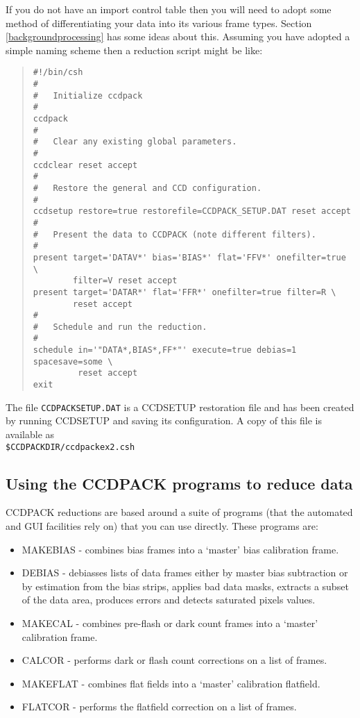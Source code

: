\documentclass[twoside,11pt]{article}
\newcommand{\htmlref}[2]{#1}
\newcommand{\latexhtml}[2]{#1}
\renewcommand{\_}{\texttt{\symbol{95}}}
\newcommand{\ttsize}{\latexhtml{\small}{}}
\newenvironment{myquote}{\begin{quote}\ttsize}{\end{quote}}
\newcommand{\text}[1]{{\ttsize \tt #1}}
\newcommand{\routine}[1]{{\sc #1}}
\newcommand{\xroutine}[1]{\htmlref{{\sc #1}}{#1}}
\begin{document}
If you do not have an import control table then you will need to adopt
some method of differentiating your data into its various frame
types. Section \ref{backgroundprocessing} has some ideas about this.
Assuming you have adopted a simple naming scheme then a reduction
script might be like:

\begin{center}
\end{center}
\begin{myquote}
\begin{verbatim}
#!/bin/csh
#
#   Initialize ccdpack
#
ccdpack
#
#   Clear any existing global parameters.
#
ccdclear reset accept
#
#   Restore the general and CCD configuration.
#
ccdsetup restore=true restorefile=CCDPACK_SETUP.DAT reset accept
#
#   Present the data to CCDPACK (note different filters).
#
present target='DATAV*' bias='BIAS*' flat='FFV*' onefilter=true \
        filter=V reset accept
present target='DATAR*' flat='FFR*' onefilter=true filter=R \
        reset accept
#
#   Schedule and run the reduction.
#
schedule in='"DATA*,BIAS*,FF*"' execute=true debias=1 spacesave=some \
         reset accept
exit
\end{verbatim}
\end{myquote}
The file \text{CCDPACK\_SETUP.DAT}
is a \xroutine{CCDSETUP} restoration file and has been created by
running \routine{CCDSETUP} and saving its configuration.
A copy of this file is available as \\
\text{\$CCDPACK\_DIR/ccdpack\_ex2.csh}

\subsection{Using the CCDPACK programs to reduce data}
CCDPACK reductions are based around a suite of programs (that the
automated and GUI facilities rely on) that you can use directly. These
programs are:
\begin{itemize}
\item \xroutine{MAKEBIAS} - combines bias frames into a `master' bias calibration
frame.
\item \xroutine{DEBIAS}   - debiasses lists of data frames either by master bias
subtraction or by estimation from the bias strips, applies bad data
masks, extracts a subset of the data area, produces errors and
detects saturated pixels values.
\item \xroutine{MAKECAL}  - combines pre-flash or dark count frames into a `master'
calibration frame.
\item \xroutine{CALCOR}   - performs dark or flash count corrections on a list of
frames.
\item \xroutine{MAKEFLAT} - combines flat fields into a `master' calibration
                 flatfield.
\item \xroutine{FLATCOR}  - performs the flatfield correction on a list of frames.
\end{itemize}
\end{document}
